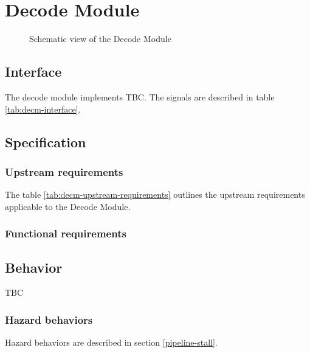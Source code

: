 \section{Decode Module}

\begin{figure}[h!]
    \centering
    
    \caption{Schematic view of the Decode Module}
    \label{fig:decm}
\end{figure}

\subsection{Interface}

\begin{content}
The decode module implements TBC. The signals are described in table \ref{tab:decm-interface}. 
\end{content}



\subsection{Specification}

\subsubsection{Upstream requirements}

The table \ref{tab:decm-upstream-requirements} outlines the upstream requirements applicable to the Decode Module.



\subsubsection{Functional requirements}

\subsection{Behavior}

\begin{content}
  TBC
\end{content}

\subsubsection{Hazard behaviors}

\begin{content}
  Hazard behaviors are described in section \ref{pipeline-stall}.
\end{content}

\newpage